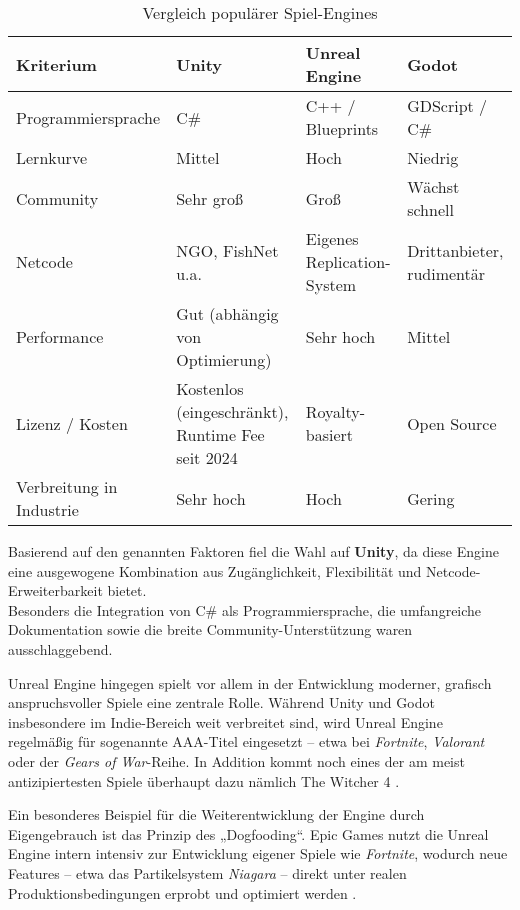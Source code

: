 \begin{table}[H]
\centering
\caption{Vergleich populärer Spiel-Engines}
{\small
\begin{tabularx}{\textwidth}{|l|Y|Y|Y|}
\hline
\textbf{Kriterium} & \textbf{Unity} & \textbf{Unreal Engine} & \textbf{Godot} \\
\hline
Programmiersprache & C\# & C++ / Blueprints & GDScript / C\# \\
\hline
Lernkurve & Mittel & Hoch & Niedrig \\
\hline
Community & Sehr groß & Groß & Wächst schnell \\
\hline
Netcode & NGO, FishNet u.a. & Eigenes Replication-System & Drittanbieter, rudimentär \\
\hline
Performance & Gut (abhängig von Optimierung) & Sehr hoch & Mittel \\
\hline
Lizenz / Kosten & Kostenlos (eingeschränkt), Runtime Fee seit 2024 \cite{unitylicense} & Royalty-basiert \cite{unrealpricing} & Open Source \cite{godotdoc} \\
\hline
Verbreitung in Industrie & Sehr hoch & Hoch & Gering \\
\hline
\end{tabularx}
}
\end{table}

\newpage
Basierend auf den genannten Faktoren fiel die Wahl auf \textbf{Unity}, da diese Engine eine ausgewogene Kombination aus Zugänglichkeit, Flexibilität und Netcode-Erweiterbarkeit bietet. \\
Besonders die Integration von C\# als Programmiersprache, die umfangreiche Dokumentation sowie die breite Community-Unterstützung waren ausschlaggebend.

Unreal Engine hingegen spielt vor allem in der Entwicklung moderner, grafisch anspruchsvoller Spiele eine zentrale Rolle. Während Unity und Godot insbesondere im Indie-Bereich weit verbreitet sind, wird Unreal Engine regelmäßig für sogenannte AAA-Titel eingesetzt -- etwa bei \textit{Fortnite}, \textit{Valorant} oder der \textit{Gears of War}-Reihe. In Addition kommt noch eines der am meist antizipiertesten Spiele überhaupt dazu nämlich The Witcher 4 \cite{witcher-4-demo}. 

Ein besonderes Beispiel für die Weiterentwicklung der Engine durch Eigengebrauch ist das Prinzip des „Dogfooding“. Epic Games nutzt die Unreal Engine intern intensiv zur Entwicklung eigener Spiele wie \textit{Fortnite}, wodurch neue Features -- etwa das Partikelsystem \textit{Niagara} -- direkt unter realen Produktionsbedingungen erprobt und optimiert werden \cite{dogfoodingexample}.

